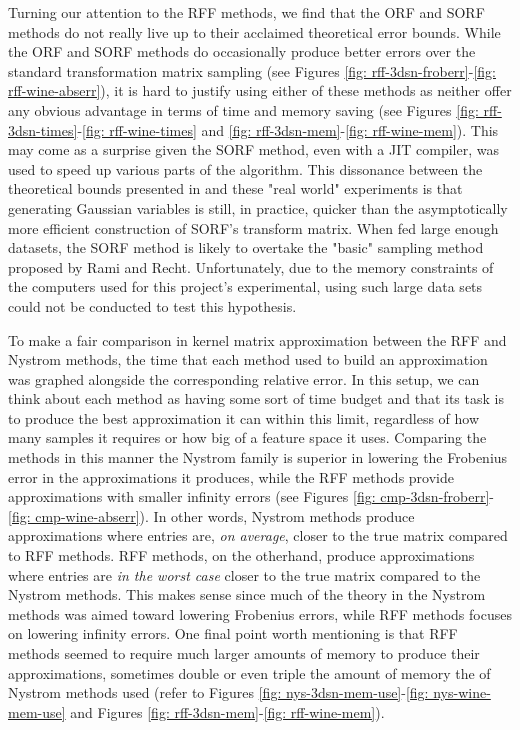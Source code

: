 Turning our attention to the RFF methods, we find that the ORF and SORF methods do not really live up to their acclaimed theoretical error bounds. While the ORF and SORF methods do occasionally produce better errors over the standard transformation matrix sampling (see Figures \ref{fig: rff-3dsn-froberr}-\ref{fig: rff-wine-abserr}), it is hard to justify using either of these methods as neither offer any obvious advantage in terms of time and memory saving (see Figures \ref{fig: rff-3dsn-times}-\ref{fig: rff-wine-times} and \ref{fig: rff-3dsn-mem}-\ref{fig: rff-wine-mem}). This may come as a surprise given the SORF method, even with a JIT compiler, was used to speed up various parts of the algorithm. This dissonance between the theoretical bounds presented in  and these "real world" experiments is that generating Gaussian variables is still, in practice, quicker than the asymptotically more efficient construction of SORF's transform matrix. When fed large enough datasets, the SORF method is likely to overtake the "basic" sampling method proposed by Rami and Recht. Unfortunately, due to the memory constraints of the computers used for this project's experimental, using such large data sets could not be conducted to test this hypothesis.

To make a fair comparison in kernel matrix approximation between the RFF and Nystrom methods, the time that each method used to build an approximation was graphed alongside the corresponding relative error. In this setup, we can think about each method as having some sort of time budget and that its task is to produce the best approximation it can within this limit, regardless of how many samples it requires or how big of a feature space it uses. Comparing the methods in this manner the Nystrom family is superior in lowering the Frobenius error in the approximations it produces, while the RFF methods provide approximations with smaller infinity errors (see Figures \ref{fig: cmp-3dsn-froberr}-\ref{fig: cmp-wine-abserr}). In other words, Nystrom methods produce approximations where entries are, {\it on average}, closer to the true matrix compared to RFF methods. RFF methods, on the otherhand, produce approximations where entries are {\it in the worst case} closer to the true matrix compared to the Nystrom methods. This makes sense since much of the theory in the Nystrom methods was aimed toward lowering Frobenius errors, while RFF methods focuses on lowering infinity errors. One final point worth mentioning is that RFF methods seemed to require much larger amounts of memory to produce their approximations, sometimes double or even triple the amount of memory the of Nystrom methods used (refer to Figures \ref{fig: nys-3dsn-mem-use}-\ref{fig: nys-wine-mem-use} and Figures \ref{fig: rff-3dsn-mem}-\ref{fig: rff-wine-mem}).

